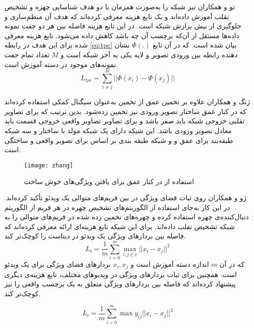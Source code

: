 تو و همکاران
\cite{tu2020learning}
 نیز شبکه  را به‌صورت همزمان با دو هدف شناسایی چهره و تشخیص تقلب آموزش داده‌اند و یک تابع هزینه معرفی کرده‌اند که هدف آن منظم‌سازی
  و جلوگیری از بیش برازش شبکه است. در این تابع هزینه فاصله بین هر دو جفت نمونه داده‌ها مستقل از آن‌که برچسب آن چه باشد کاهش داده می‌شود. تابع هزینه معرفی شده برای این هدف در رابطه
\ref{eq:tpc}
 بیان شده است. که در آن تابع 
 $\Phi(.)$
  نشان دهنده رابطه بین ورودی تصویر و لایه یکی به آخر شبکه است و $M$ تعداد تمام جفت نمونه‌های موجود در دسته آموزش است. 
  \begin{equation}\label{eq:tpc}
 	L_{tpc}=\sum_{i\ne j}^{M}||\Phi(x_i)-\Phi(x_j)||
 \end{equation}

ژنگ و همکاران
\cite{zhang2020face}
علاوه بر تخمین عمق از تخمین  به‌عنوان سیگنال کمکی استفاده کرده‌اند که در کنار عمق ساختار  تصویر ورودی نیز تخمین زده‌شود. بدین ترتیب که برای تصاویر تقلبی خروجی  شبکه باید صفر باشد و برای تصاویر تصاویر واقعی خروجی قسمت  باید معادل  تصویر ورودی باشد. این شبکه دارای یک شبکه مولد با ساختار  و سه شبکه طبقه‌بند برای عمق و  و شبکه طبقه بندی بر اساس  برای تصویر واقعی و ساختگی است.
 \begin{figure}[h]
	\centerline{\texttt{[image: zhang]}}
	\caption{استفاده از  در کنار عمق برای یافتن ویژگی‌های خوش ساخت \cite{zhang2020face} }
	\label{fig:zhang}
\end{figure}

ژو و همکاران
\cite{xu2021improving}
روی ثبات فضای ویژگی در بین فریم‌های متوالی یک ویدئو تأکید کرده‌اند. در این کار به‌جای استفاده از الگوریتم‌های تشخیص چهره در هر فریم از الگوریتم دنبال‌کننده‌ی چهره استفاده کرده و چهره‌های تخمین زده شده در فریم‌های متوالی را به شبکه تشخیص تقلب داده‌اند. برای این شبکه تابع هزینه‌ای ارائه معرفی کرده‌اند که فاصله بین بردارهای ویژگی یک ویدئو در دیتاست را کوچک‌تر کند. 
  \begin{equation}\label{eq:xult}
	L_{t}=\frac{1}{m}\sum_{i=0}^{m}\max_{i,j \in v}{||x_i-x_j||^2}
\end{equation}
که در آن 
$m$
 اندازه دسته آموزش است و
$x_i,x_j$
بردارهای فضای ویژگی برای یک ویدئو است. همچنین برای ثبات بردارهای ویژگی در ویدیوهای مختلف، تابع هزینه‌ی دیگری پیشنهاد کرده‌اند که فاصله بین بردارهای ویژگی متعلق به یک برچسب واقعی را نیز کوچک‌تر کند.

  \begin{equation}\label{eq:xule}
	L_{t}=\frac{1}{m}\sum_{i=0}^{m}\max{y_{ij}||x_i-x_j||^2}
\end{equation}

